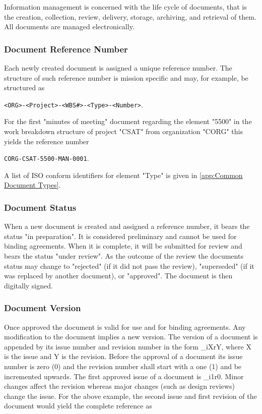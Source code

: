 Information management is concerned with the life cycle of documents, that is the creation, collection, review, delivery, storage, archiving, and retrieval of them. All documents are managed electronically.

\subsubsection{Document Reference Number}

Each newly created document is assigned a unique reference number. The structure of such reference number is mission specific and may, for example, be structured as

\texttt{<ORG>-<Project>-<WBS\#>-<Type>-<Number>}. 

For the first "minutes of meeting" document regarding the element "5500" in the work breakdown structure of  project "CSAT" from organization "CORG" this yields the reference number 

\texttt{CORG-CSAT-5500-MAN-0001}. 

A list of ISO conform identifiers for element "Type" is given in \ref{app:Common Document Types}.

\subsubsection{Document Status}

When a new document is created and assigned a reference number, it bears the status "in preparation". It is considered preliminary and cannot be used for binding agreements. When it is complete, it will be submitted for review and bears the status "under review". As the outcome of the review the documents status may change to "rejected" (if it did not pass the review), "superseded" (if it was replaced by another document), or "approved". The document is then digitally signed.

\subsubsection{Document Version}

Once approved the document is valid for use and for binding agreements. Any modification to the document implies a new version. The version of a document is appended by its issue number and revision number in the form \_iXrY, where X is the issue and Y is the revision. Before the approval of a document its issue number is zero (0) and the revision number shall start with a one (1) and be incremented upwards. The first approved issue of a document is \_i1r0. Minor changes affect the revision whereas major changes (such as design reviews) change the issue. For the above example, the second issue and first revision of the document would yield the complete reference as 

